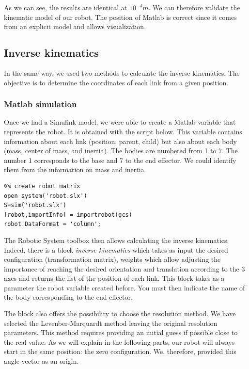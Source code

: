 \bigbreak
As we can see, the results are identical at $10^{-4}m$. We can therefore validate the kinematic model of our robot. The position of Matlab is correct since it comes from an explicit model and allows visualization.

\subsection{Inverse kinematics}

In the same way, we used two methods to calculate the inverse kinematics. The objective is to determine the coordinates of each link from a given position.

\subsubsection{Matlab simulation}

Once we had a Simulink model, we were able to create a Matlab variable that represents the robot. It is obtained with the script below.  This variable contains information about each link (position, parent, child) but also about each body (mass, center of mass, and inertia). The bodies are numbered from 1 to 7. The number 1 corresponds to the base and 7 to the end effector. We could identify them from the information on mass and inertia.

\begin{verbatim}
%% create robot matrix
open_system('robot.slx')
S=sim('robot.slx')
[robot,importInfo] = importrobot(gcs)
robot.DataFormat = 'column';
\end{verbatim}

\bigbreak
The Robotic System toolbox then allows calculating the inverse kinematics. Indeed, there is a block \textit{inverse kinematics} which takes as input the desired configuration (transformation matrix), weights which allow adjusting the importance of reaching the desired orientation and translation according to the 3 axes and returns the list of the position of each link. This block takes as a parameter the robot variable created before. You must then indicate the name of the body corresponding to the end effector.

\bigbreak
The block also offers the possibility to choose the resolution method. We have selected the Levenber-Marquardt method leaving the original resolution parameters. This method requires providing an initial guess if possible close to the real value. As we will explain in the following parts, our robot will always start in the same position: the zero configuration. We, therefore, provided this angle vector as an origin.

